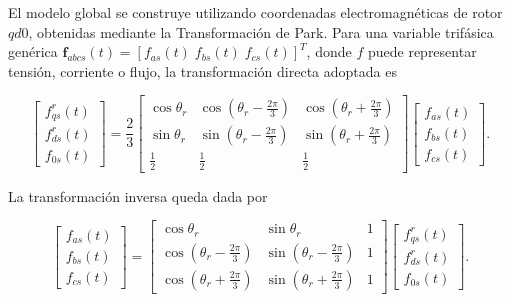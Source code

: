 \documentclass[10pt,a4paper]{article}
\begin{document}
El modelo global se construye utilizando coordenadas electromagnéticas de rotor \(qd0\), obtenidas mediante la Transformación de Park. Para una variable trifásica genérica \(\mathbf{f}_{abcs}(t)=[f_{as}(t)\; f_{bs}(t)\; f_{cs}(t)]^T\), donde \(f\) puede representar tensión, corriente o flujo, la transformación directa adoptada es

\begin{equation}
    \begin{bmatrix}
        f_{qs}^{r}(t)\\
        f_{ds}^{r}(t)\\
        f_{0s}(t)
    \end{bmatrix}
    =
    \frac{2}{3}
    \begin{bmatrix}
        \cos\theta_r & \cos\left(\theta_r-\frac{2\pi}{3}\right) & \cos\left(\theta_r+\frac{2\pi}{3}\right)\\
        \sin\theta_r & \sin\left(\theta_r-\frac{2\pi}{3}\right) & \sin\left(\theta_r+\frac{2\pi}{3}\right)\\
        \frac{1}{2} & \frac{1}{2} & \frac{1}{2}
    \end{bmatrix}
    \begin{bmatrix}
        f_{as}(t)\\
        f_{bs}(t)\\
        f_{cs}(t)
    \end{bmatrix}.
    \label{eq:park_directa}
\end{equation}

La transformación inversa queda dada por

\begin{equation}
    \begin{bmatrix}
        f_{as}(t)\\
        f_{bs}(t)\\
        f_{cs}(t)
    \end{bmatrix}
    =
    \begin{bmatrix}
        \cos\theta_r & \sin\theta_r & 1\\
        \cos\left(\theta_r-\frac{2\pi}{3}\right) & \sin\left(\theta_r-\frac{2\pi}{3}\right) & 1\\
        \cos\left(\theta_r+\frac{2\pi}{3}\right) & \sin\left(\theta_r+\frac{2\pi}{3}\right) & 1
    \end{bmatrix}
    \begin{bmatrix}
        f_{qs}^{r}(t)\\
        f_{ds}^{r}(t)\\
        f_{0s}(t)
    \end{bmatrix}.
    \label{eq:park_inversa}
\end{equation}
\end{document}
